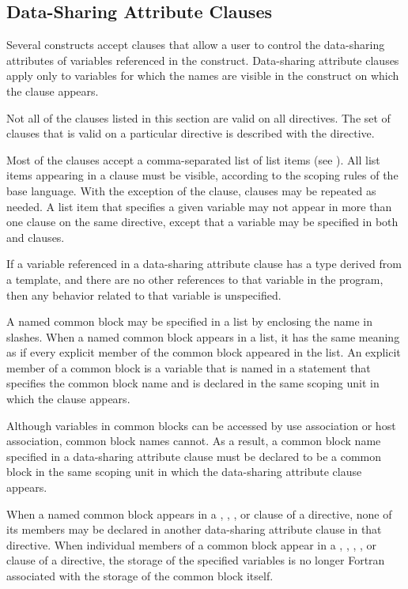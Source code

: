 \subsection{Data-Sharing Attribute Clauses}
\label{subsec:Data-Sharing Attribute Clauses}
Several constructs accept clauses that allow a user to control the data-sharing attributes 
of variables referenced in the construct. Data-sharing attribute clauses apply only to 
variables for which the names are visible in the construct on which the clause appears.

Not all of the clauses listed in this section are valid on all directives. The set of clauses 
that is valid on a particular directive is described with the directive.

Most of the clauses accept a comma-separated list of list items (see 
). 
All list items appearing in a clause must be visible, according to the scoping rules 
of the base language. With the exception of the  clause, clauses may be 
repeated as needed. A list item that specifies a given variable may not appear in more 
than one clause on the same directive, except that a variable may be specified in both 
 and  clauses.

\cppspecificstart
If a variable referenced in a data-sharing attribute clause has a type derived from a 
template, and there are no other references to that variable in the program, then any 
behavior related to that variable is unspecified. 
\cppspecificend

\fortranspecificstart
A named common block may be specified in a list by enclosing the name in slashes. 
When a named common block appears in a list, it has the same meaning as if every 
explicit member of the common block appeared in the list. An explicit member of a 
common block is a variable that is named in a  statement that specifies the 
common block name and is declared in the same scoping unit in which the clause 
appears.

Although variables in common blocks can be accessed by use association or host 
association, common block names cannot. As a result, a common block name specified 
in a data-sharing attribute clause must be declared to be a common block in the same 
scoping unit in which the data-sharing attribute clause appears.

When a named common block appears in a , , 
, or  clause of a directive, none of its members may be declared 
in another data-sharing attribute clause in that directive. When individual members of a common block appear in a , , 
, , or  clause of a directive, the storage of the specified variables is no longer Fortran associated with the storage of the common block itself.
\fortranspecificend










